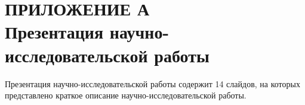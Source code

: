 \documentclass[a4paper,14pt, unknownkeysallowed]{extreport}
\begin{document}
%




\renewcommand{\contentsname}{СОДЕРЖАНИЕ} %
\tableofcontents








\chapter*{ПРИЛОЖЕНИЕ А\\Презентация научно-исследовательской работы}
Презентация научно-исследовательской работы содержит 14 слайдов, на которых представлено краткое описание научно-исследовательской работы.
\end{document}
